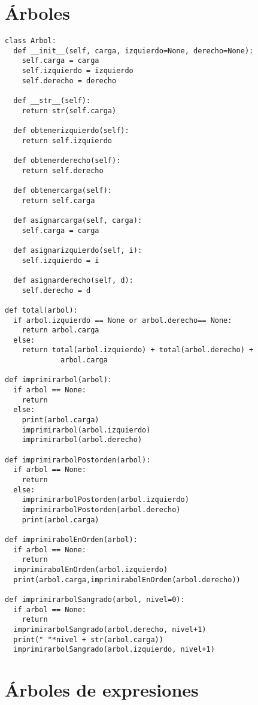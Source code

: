 \section{Árboles}

\begin{verbatim}
class Arbol:
  def __init__(self, carga, izquierdo=None, derecho=None):
    self.carga = carga
    self.izquierdo = izquierdo
    self.derecho = derecho
      
  def __str__(self):
    return str(self.carga)
  
  def obtenerizquierdo(self):
    return self.izquierdo
  
  def obtenerderecho(self):
    return self.derecho
  
  def obtenercarga(self):
    return self.carga
    
  def asignarcarga(self, carga):
    self.carga = carga
  
  def asignarizquierdo(self, i):
    self.izquierdo = i
    
  def asignarderecho(self, d):
    self.derecho = d

def total(arbol):
  if arbol.izquierdo == None or arbol.derecho== None:
    return arbol.carga
  else:
    return total(arbol.izquierdo) + total(arbol.derecho) + 
             arbol.carga
   
def imprimirarbol(arbol):
  if arbol == None:
    return 
  else:
    print(arbol.carga)
    imprimirarbol(arbol.izquierdo)
    imprimirarbol(arbol.derecho)

def imprimirarbolPostorden(arbol):
  if arbol == None:
    return
  else:
    imprimirarbolPostorden(arbol.izquierdo)
    imprimirarbolPostorden(arbol.derecho)
    print(arbol.carga)   

def imprimirabolEnOrden(arbol):
  if arbol == None:
    return
  imprimirabolEnOrden(arbol.izquierdo)
  print(arbol.carga,imprimirabolEnOrden(arbol.derecho))

def imprimirarbolSangrado(arbol, nivel=0):
  if arbol == None:
    return
  imprimirarbolSangrado(arbol.derecho, nivel+1)
  print(" "*nivel + str(arbol.carga))
  imprimirarbolSangrado(arbol.izquierdo, nivel+1)
\end{verbatim}

\section{Árboles de expresiones}

